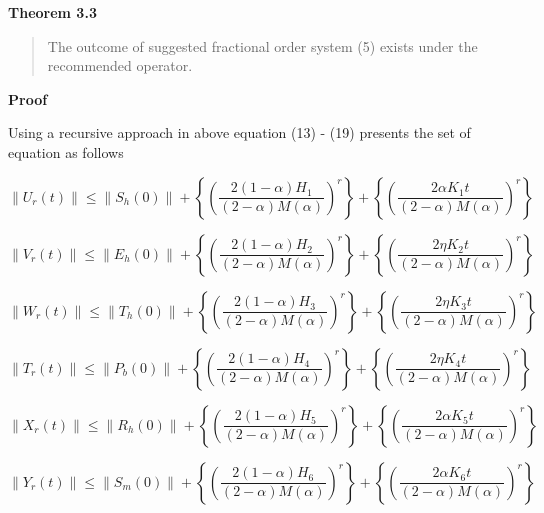 \documentclass[10pt]{NSP1}
\begin{document}
\textbf{Theorem 3.3}

\begin{quote}
The outcome of suggested fractional order system (5) exists under the recommended operator.
\end{quote}

\textbf{Proof}

Using a recursive approach in above equation (13) - (19) presents the set of equation as follows

{\small
\begin{equation}
\| U_{r}(t)\| \leq \| S_{h}(0)\| + \left\{ \left( \frac{2(1 - \alpha)H_{1}}{(2 - \alpha)M(\alpha)} \right)^{r} \right\} + \left\{ \left( \frac{2\alpha K_{1}t}{(2 - \alpha)M(\alpha)} \right)^{r} \right\}
\end{equation}
}

{\small
\begin{equation}
\| V_{r}(t)\| \leq \| E_{h}(0)\| + \left\{ \left( \frac{2(1 - \alpha)H_{2}}{(2 - \alpha)M(\alpha)} \right)^{r} \right\} + \left\{ \left( \frac{2\eta K_{2}t}{(2 - \alpha)M(\alpha)} \right)^{r} \right\}
\end{equation}
}

{\small
\begin{equation}
\| W_{r}(t)\| \leq \| T_{h}(0)\| + \left\{ \left( \frac{2(1 - \alpha)H_{3}}{(2 - \alpha)M(\alpha)} \right)^{r} \right\} + \left\{ \left( \frac{2\eta K_{3}t}{(2 - \alpha)M(\alpha)} \right)^{r} \right\}
\end{equation}
}

{\small
\begin{equation}
\| T_{r}(t)\| \leq \| P_{b}(0)\| + \left\{ \left( \frac{2(1 - \alpha)H_{4}}{(2 - \alpha)M(\alpha)} \right)^{r} \right\} + \left\{ \left( \frac{2\eta K_{4}t}{(2 - \alpha)M(\alpha)} \right)^{r} \right\}
\end{equation}
}

{\small
\begin{equation}
\| X_{r}(t)\| \leq \| R_{h}(0)\| + \left\{ \left( \frac{2(1 - \alpha)H_{5}}{(2 - \alpha)M(\alpha)} \right)^{r} \right\} + \left\{ \left( \frac{2\alpha K_{5}t}{(2 - \alpha)M(\alpha)} \right)^{r} \right\}
\end{equation}
}

{\small
\begin{equation}
\| Y_{r}(t)\| \leq \| S_{m}(0)\| + \left\{ \left( \frac{2(1 - \alpha)H_{6}}{(2 - \alpha)M(\alpha)} \right)^{r} \right\} + \left\{ \left( \frac{2\alpha K_{6}t}{(2 - \alpha)M(\alpha)} \right)^{r} \right\}
\end{equation}
}
\end{document}

